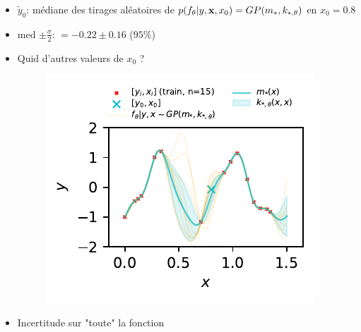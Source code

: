 \documentclass[xcolor=svgnames, t]{beamer}
\newcommand{\vectorx}[1]{\boldsymbol{\MakeLowercase{\mathbf{#1}}}}
\begin{document}
\begin{frame}{\subsecname}
  \begin{itemize}
    \item $\tilde{y}_0$: médiane des tirages aléatoires de $p(f_\theta | y, \vectorx{x}, x_0) = GP(m_{*}, k_{*, \theta})$ en $x_0 =0.8$
    \item med $\pm \frac{\sigma}{2}$: $ = -0.22 \pm 0.16$ ($95\%$)
  \end{itemize}
\end{frame}

\begin{frame}{\subsecname}
  \begin{itemize}
    \item Quid d'autres valeurs de $x_0$ ?
      \begin{figure}
        \includegraphics{gp_1D_example_noisefree_pred_meanvar.pdf}
      \end{figure}
    \item Incertitude sur "toute" la fonction
  \end{itemize}
\end{frame}

\end{document}
